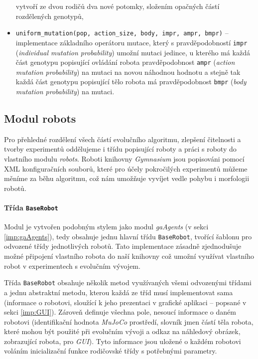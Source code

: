 \begin{itemize}
        vytvoří ze dvou rodičů dva nové potomky, složením opačných částí
        rozdělených genotypů,
    \item \texttt{uniform\_mutation(pop, action\_size, body, impr, ampr, bmpr)}
        -- \linebreak implementace základního operátoru mutace, který s
        pravděpodobností \texttt{impr} (\emph{individual mutation probability})
        umožní mutaci jedince, u kterého má \linebreak každá část genotypu
        popisující ovládání robota pravděpodobnost \texttt{ampr} \linebreak
        (\emph{action mutation probability}) na mutaci na novou náhodnou
        hodnotu a stejně tak každá část genotypu popisující tělo robota má
        pravděpodobnost \texttt{bmpr} (\emph{body mutation probability}) na
        mutaci.
\end{itemize}

\subsection{Modul robots} \label{imp:robots}
Pro přehledné rozdělení všech částí evolučního algoritmu, zlepšení čitelnosti a
tvorby experimentů oddělujeme i třídu popisující roboty a práci s roboty do
vlastního modulu \emph{robots}. Roboti knihovny \emph{Gymnasium} jsou
popisováni pomocí XML konfiguračních souborů, které pro účely pokročilých
experimentů můžeme měníme za běhu algoritmu, což nám umožňuje vyvíjet vedle
pohybu i morfologii robotů. 

\paragraph{Třída \texttt{BaseRobot}}
Modul je vytvořen podobným stylem jako modul \emph{gaAgents} (v sekci
\ref{imp:gaAgents}), tedy obsahuje jednu hlavní třídu \texttt{BaseRobot},
tvořící šablonu pro odvozené třídy jednotlivých robotů. Tato implementace
zásadně zjednodušuje možné připojení vlastního robota do naší knihovny což
umožní využívat vlastního robot v experimentech s evolučním vývojem. 

Třída \texttt{BaseRobot} obsahuje několik metod využívaných všemi odvozenými
třídami a jednu abstraktní metodu, kterou každá ze tříd musí implementovat sama
(informace o robotovi, sloužící k jeho prezentaci v grafické aplikaci --
popsané v sekci \ref{imp:GUI}). Zároveň definuje všechna pole, nesoucí
informace o daném robotovi (identifikační hodnota \emph{MuJoCo} prostředí,
slovník jmen částí těla robota, které mohou být použité při evolučním vývoji a
odkaz na náhledový obrázek, zobrazující robota, pro \emph{GUI}). Tyto informace
jsou uložené o každém robotovi voláním inicializační funkce rodičovské třídy s
potřebnými parametry.

